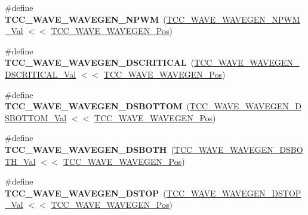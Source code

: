 \begin{DoxyCompactItemize}
\item 
\hypertarget{group___s_a_m_l21___t_c_c_ga07ac4bf8e7be7bf49ecbf6bb5861a409}{}\#define {\bfseries T\+C\+C\+\_\+\+W\+A\+V\+E\+\_\+\+W\+A\+V\+E\+G\+E\+N\+\_\+\+N\+P\+W\+M}~(\hyperlink{group___s_a_m_l21___t_c_c_ga99a1d2484b970381acb1869d345d6787}{T\+C\+C\+\_\+\+W\+A\+V\+E\+\_\+\+W\+A\+V\+E\+G\+E\+N\+\_\+\+N\+P\+W\+M\+\_\+\+Val}     $<$$<$ \hyperlink{group___s_a_m_l21___t_c_c_gabc932c28cfac8cdd585de6664d7665e2}{T\+C\+C\+\_\+\+W\+A\+V\+E\+\_\+\+W\+A\+V\+E\+G\+E\+N\+\_\+\+Pos})\label{group___s_a_m_l21___t_c_c_ga07ac4bf8e7be7bf49ecbf6bb5861a409}

\item 
\hypertarget{group___s_a_m_l21___t_c_c_gaf5bd44fb6c11fe86dafa6d34742b0325}{}\#define {\bfseries T\+C\+C\+\_\+\+W\+A\+V\+E\+\_\+\+W\+A\+V\+E\+G\+E\+N\+\_\+\+D\+S\+C\+R\+I\+T\+I\+C\+A\+L}~(\hyperlink{group___s_a_m_l21___t_c_c_ga8e5a9c817fedc6b9ebb78bec9843c5ce}{T\+C\+C\+\_\+\+W\+A\+V\+E\+\_\+\+W\+A\+V\+E\+G\+E\+N\+\_\+\+D\+S\+C\+R\+I\+T\+I\+C\+A\+L\+\_\+\+Val} $<$$<$ \hyperlink{group___s_a_m_l21___t_c_c_gabc932c28cfac8cdd585de6664d7665e2}{T\+C\+C\+\_\+\+W\+A\+V\+E\+\_\+\+W\+A\+V\+E\+G\+E\+N\+\_\+\+Pos})\label{group___s_a_m_l21___t_c_c_gaf5bd44fb6c11fe86dafa6d34742b0325}

\item 
\hypertarget{group___s_a_m_l21___t_c_c_ga2e4608c028feeaac78e8e74b0082b23e}{}\#define {\bfseries T\+C\+C\+\_\+\+W\+A\+V\+E\+\_\+\+W\+A\+V\+E\+G\+E\+N\+\_\+\+D\+S\+B\+O\+T\+T\+O\+M}~(\hyperlink{group___s_a_m_l21___t_c_c_gaa1a648a47c6844a5680d4c24efd28e30}{T\+C\+C\+\_\+\+W\+A\+V\+E\+\_\+\+W\+A\+V\+E\+G\+E\+N\+\_\+\+D\+S\+B\+O\+T\+T\+O\+M\+\_\+\+Val} $<$$<$ \hyperlink{group___s_a_m_l21___t_c_c_gabc932c28cfac8cdd585de6664d7665e2}{T\+C\+C\+\_\+\+W\+A\+V\+E\+\_\+\+W\+A\+V\+E\+G\+E\+N\+\_\+\+Pos})\label{group___s_a_m_l21___t_c_c_ga2e4608c028feeaac78e8e74b0082b23e}

\item 
\hypertarget{group___s_a_m_l21___t_c_c_gac9baadb5b33f85497d40b9571fb798ed}{}\#define {\bfseries T\+C\+C\+\_\+\+W\+A\+V\+E\+\_\+\+W\+A\+V\+E\+G\+E\+N\+\_\+\+D\+S\+B\+O\+T\+H}~(\hyperlink{group___s_a_m_l21___t_c_c_ga4d5066190c67f24b2eabb721d85645ae}{T\+C\+C\+\_\+\+W\+A\+V\+E\+\_\+\+W\+A\+V\+E\+G\+E\+N\+\_\+\+D\+S\+B\+O\+T\+H\+\_\+\+Val}   $<$$<$ \hyperlink{group___s_a_m_l21___t_c_c_gabc932c28cfac8cdd585de6664d7665e2}{T\+C\+C\+\_\+\+W\+A\+V\+E\+\_\+\+W\+A\+V\+E\+G\+E\+N\+\_\+\+Pos})\label{group___s_a_m_l21___t_c_c_gac9baadb5b33f85497d40b9571fb798ed}

\item 
\hypertarget{group___s_a_m_l21___t_c_c_ga8974f2572fd5719458c97600437077f9}{}\#define {\bfseries T\+C\+C\+\_\+\+W\+A\+V\+E\+\_\+\+W\+A\+V\+E\+G\+E\+N\+\_\+\+D\+S\+T\+O\+P}~(\hyperlink{group___s_a_m_l21___t_c_c_gaa1cb0a0b59077e94380e08306e7d7600}{T\+C\+C\+\_\+\+W\+A\+V\+E\+\_\+\+W\+A\+V\+E\+G\+E\+N\+\_\+\+D\+S\+T\+O\+P\+\_\+\+Val}    $<$$<$ \hyperlink{group___s_a_m_l21___t_c_c_gabc932c28cfac8cdd585de6664d7665e2}{T\+C\+C\+\_\+\+W\+A\+V\+E\+\_\+\+W\+A\+V\+E\+G\+E\+N\+\_\+\+Pos})\label{group___s_a_m_l21___t_c_c_ga8974f2572fd5719458c97600437077f9}


\end{DoxyCompactItemize}
